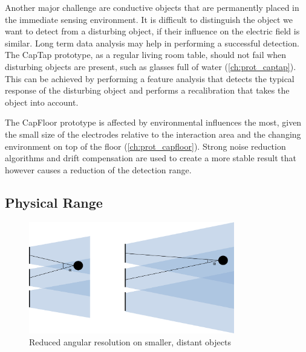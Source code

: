 Another major challenge are conductive objects that are permanently placed in the immediate sensing environment. It is difficult to distinguish the object we want to detect from a disturbing object, if their influence on the electric field is similar. Long term data analysis may help in performing a successful detection. The CapTap prototype, as a regular living room table, should not fail when disturbing objects are present, such as glasses full of water (\ref{ch:prot_captap}). This can be achieved by performing a feature analysis that detects the typical response of the disturbing object and performs a recalibration that takes the object into account. 

The CapFloor prototype is affected by environmental influences the most, given the small size of the electrodes relative to the interaction area and the changing environment on top of the floor (\ref{ch:prot_capfloor}). Strong noise reduction algorithms and drift compensation are used to create a more stable result that however causes a reduction of the detection range.
\subsection{Physical Range}
\begin{figure}[ht]
\centering
\includegraphics[width=0.8\textwidth]{images/limit_distance}
\caption{Reduced angular resolution on smaller, distant objects}
\label{fig:disc_ang_resolution}
\end{figure}

